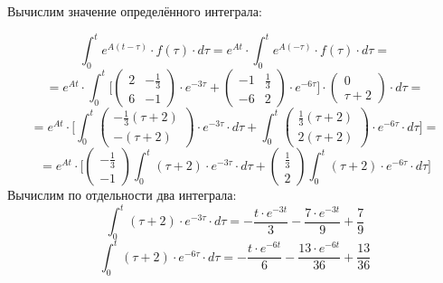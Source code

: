 Вычислим значение определённого интеграла:

\begin{displaymath}
\int_0^t e^{A(t - \tau)} \cdot f(\tau) \cdot d \tau = e^{At} \cdot \int_0^t e^{A(-\tau)} \cdot f(\tau) \cdot d \tau =
\end{displaymath}
\begin{displaymath}
= e^{At} \cdot \int_0^t \Big [ \begin{pmatrix}
2 & - \frac{1}{3}
\\
6 & -1
\end{pmatrix} \cdot e^{-3 \tau} + \begin{pmatrix}
-1 & \frac{1}{3}
\\
-6 & 2
\end{pmatrix} \cdot e^{-6 \tau} \Big ] \cdot \begin{pmatrix}
0
\\
\tau + 2
\end{pmatrix} \cdot d \tau =
\end{displaymath}
\begin{displaymath}
= e^{At} \cdot \Big [ \int_0^t \begin{pmatrix}
- \frac{1}{3} (\tau + 2)
\\
-(\tau + 2)
\end{pmatrix} \cdot e^{-3 \tau} \cdot d \tau + \int_0^t \begin{pmatrix}
\frac{1}{3} (\tau + 2)
\\
2 (\tau + 2)
\end{pmatrix} \cdot e^{-6 \tau} \cdot d \tau \Big ] = 
\end{displaymath}
\begin{displaymath}
= e^{At} \cdot \Big [  \begin{pmatrix}
- \frac{1}{3}
\\
- 1
\end{pmatrix} \int_0^t (\tau + 2) \cdot e^{-3 \tau} \cdot d \tau + \begin{pmatrix}
\frac{1}{3}
\\
2 
\end{pmatrix} \int_0^t (\tau + 2) \cdot e^{-6 \tau} \cdot d \tau \Big ]
\end{displaymath}
Вычислим по отдельности два интеграла:
\begin{displaymath}
\int_0^t (\tau + 2) \cdot e^{-3 \tau} \cdot d \tau = - \frac{t \cdot e^{-3t}}{3} - \frac{7 \cdot e^{-3t}}{9} + \frac{7}{9}
\end{displaymath}
\begin{displaymath}
\int_0^t (\tau + 2) \cdot e^{-6 \tau} \cdot d \tau = - \frac{t \cdot e^{-6t}}{6} - \frac{13 \cdot e^{-6t}}{36} + \frac{13}{36}
\end{displaymath}

